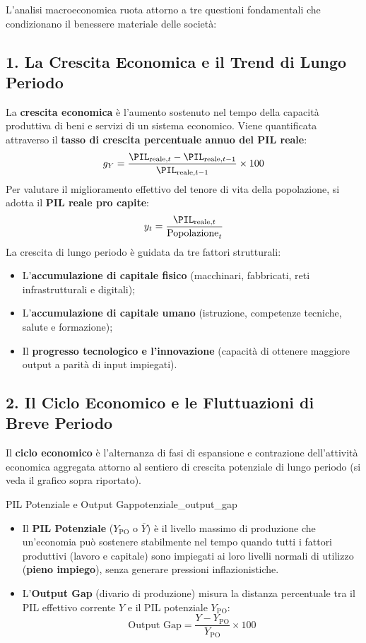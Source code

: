 L'analisi macroeconomica ruota attorno a tre questioni fondamentali che condizionano il benessere materiale delle società:

\subsection{1. La Crescita Economica e il Trend di Lungo Periodo}
La \textbf{crescita economica} è l'aumento sostenuto nel tempo della capacità produttiva di beni e servizi di un sistema economico. Viene quantificata attraverso il \textbf{tasso di crescita percentuale annuo del PIL reale}:
\begin{equation}
    g_Y = \frac{\PIL_{\text{reale}, t} - \PIL_{\text{reale}, t-1}}{\PIL_{\text{reale}, t-1}} \times 100
\end{equation}
Per valutare il miglioramento effettivo del tenore di vita della popolazione, si adotta il \textbf{PIL reale pro capite}:
\begin{equation}
    y_t = \frac{\PIL_{\text{reale}, t}}{\text{Popolazione}_t}
\end{equation}
La crescita di lungo periodo è guidata da tre fattori strutturali:
\begin{itemize}
    \item L'\textbf{accumulazione di capitale fisico} (macchinari, fabbricati, reti infrastrutturali e digitali);
    \item L'\textbf{accumulazione di capitale umano} (istruzione, competenze tecniche, salute e formazione);
    \item Il \textbf{progresso tecnologico e l'innovazione} (capacità di ottenere maggiore output a parità di input impiegati).
\end{itemize}

\subsection{2. Il Ciclo Economico e le Fluttuazioni di Breve Periodo}
Il \textbf{ciclo economico} è l'alternanza di fasi di espansione e contrazione dell'attività economica aggregata attorno al sentiero di crescita potenziale di lungo periodo (si veda il grafico sopra riportato).

\begin{definizione}{PIL Potenziale e Output Gap}{potenziale_output_gap}
\begin{itemize}
    \item Il \textbf{PIL Potenziale} ($Y_{\mathrm{PO}}$ o $\bar{Y}$) è il livello massimo di produzione che un'economia può sostenere stabilmente nel tempo quando tutti i fattori produttivi (lavoro e capitale) sono impiegati ai loro livelli normali di utilizzo (\textbf{pieno impiego}), senza generare pressioni inflazionistiche.
    \item L'\textbf{Output Gap} (divario di produzione) misura la distanza percentuale tra il PIL effettivo corrente $Y$ e il PIL potenziale $Y_{\mathrm{PO}}$:
    \begin{equation}
        \text{Output Gap} = \frac{Y - Y_{\mathrm{PO}}}{Y_{\mathrm{PO}}} \times 100
    \end{equation}
\end{itemize}
\end{definizione}

